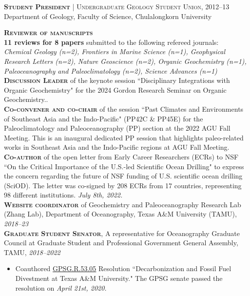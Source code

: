 \documentclass[10pt, letter]{article}
\newcommand{\margintext}[1]{\marginnote{\normalsize\textbf #1 |}}
\begin{document}
\bigskip
\textsc{\textbf{Student President}} | \textsc{Undergraduate Geology Student Union}, 2012–13 \\
Department of Geology, Faculty of Science, Chulalongkorn University

\bigskip
\margintext{Services}
\textsc{\textbf{Reviewer of manuscripts}}\\\textbf{11 reviews for 8 papers} submitted to the following refereed journals: \\
\textit{Chemical Geology (n=2), Frontiers in Marine Science (n=1), Geophysical Research Letters (n=2), Nature Geoscience (n=2), Organic Geochemistry (n=1), Paleoceanography and Paleoclimatology (n=2), Science Advances (n=1)} \\

\textsc{\textbf{Discussion Leader}} of the keynote session ``Disciplinary Integrations with Organic Geochemistry" for the 2024 Gordon Research Seminar on Organic Geochemistry.. \\

\textsc{\textbf{Co-convener and co-chair}} of the session ``Past Climates and Environments of Southeast Asia and the Indo-Pacific" (PP42C \& PP45E) for the Paleoclimatology and Paleoceanography (PP) section at the 2022 AGU Fall Meeting. This is an inaugural dedicated PP session that highlights paleo-related works in Southeast Asia and the Indo-Pacific regions at AGU Fall Meeting. \\

\textsc{\textbf{Co-author}} of the open letter from Early Career Researchers (ECRs) to NSF ``On the Critical Importance of the U.S.-led Scientific Ocean Drilling" to express the concern regarding the future of NSF funding of U.S. scientific ocean drilling (SciOD). The letter was co-signed by 208 ECRs from 17 countries, representing 98 different institutions. \textit{July 8th, 2022.} \\

\textsc{\textbf{Website coordinator}} of Geochemistry and Paleoceanography Research Lab (Zhang Lab), Department of Oceanography, Texas A\&M University (TAMU), \textit{2018–23} \\

\textsc{\textbf{Graduate Student Senator}}, A representative for Oceanography Graduate Council at Graduate Student and Professional Government General Assembly, TAMU, \textit{2018–2022} \\
\begin{itemize}[noitemsep,nolistsep,leftmargin=*]
    \item Coauthored \href{https://gpsg.tamu.edu/resolutions-and-bills/}{GPSG.R.53.05} Resolution ``Decarbonization and Fossil Fuel Divestment at Texas A\&M University." The GPSG senate passed the resolution on \textit{April 21st, 2020.}
\end{itemize}
\end{document}

